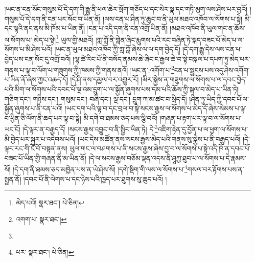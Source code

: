།ཡང་ན་ངན་སོང་གསུམ་པོ་དེ་དག་གི་རྒྱུ་ནི་ཕལ་ཆེར་སྲོག་གཅོད་པ་དང་སེར་སྣ་དང་གཏི་མུག་ལས་ཤེས་པར་བྱའོ། །གསུམ་པོ་དེ་དག་ནི་ངན་པར་སོང་བ་ཡིན་ནོ། །ལས་ངན་པ་ཤིན་ཏུ་ཆུང་བ་ནི་ཡུལ་མཐའ་འཁོབ་ལ་སོགས་པ་སྟེ། མི་དང་ལྷའི་ནང་ནས་མི་ཁོམ་པ་ཡིན་ནོ། །ངན་པ་འདི་དག་ནི་ངན་འགྲོ་ཡིན་ནོ། །མཐའ་འཁོབ་ནི་ཡུལ་གང་ན་ཆོས་ལ་སོགས་པ་:མེད་པ་སྟེ།\footnote{མེད་པའོ།  སྣར་ཐང་།  པེ་ཅིན། } ཡུལ་གྱི་མཐའོ། །ཀླ་ཀློ་ནི་གླེན་ཞིང་རྨུགས་པའི་རང་བཞིན་ཏེ་སྐད་བཟང་པོ་མེད་པ་ལ་སོགས་པ་མི་ཤེས་པའོ། །ཡང་ན་ཡུལ་མཐའ་འཁོབ་ཀྱི་ཀླ་ཀློ་ཞེས་ལ་ལ་དག་བྱེད་དོ། །དེ་དག་རྒྱུ་དེས་ལས་ངན་པ་བྱེད་པས་ངན་སོང་དུ་འགྲོ་བའོ། །ལྷ་ཚེ་རིང་པོ་ནི་བསོད་ནམས་ཆེ་ཞིང་ང་རྒྱལ་ཆེ་བ་སྟེ་བསྐལ་པ་དཔག་ཏུ་མེད་པར་གནས་པ་ལྟ་བ་ལོག་པ་གཟུགས་ཀྱི་ཁམས་ཀྱི་གནས་ནའོ། །ཡང་ན་:འགོག་པ་\footnote{འགག་པ་  སྣར་ཐང་། }ངན་པ་སྦྱངས་པས་འདུ་ཤེས་འགོག་པ་ཡིན་ནོ་ཞེས་ཀྱང་འཆད་དོ། །དེ་ཤི་ནས་དམྱལ་བར་འགྱུར་རོ། །མིར་སྐྱེས་ན་གཟུགས་ལ་སོགས་པ་ལ་དབང་བྱེད་པའི་མིག་ལ་སོགས་པའི་དབང་པོ་ལྔ་འམ་དྲུག་པ་ལ་སྐྱོན་ཞུགས་པས་དམ་པའི་ཆོས་ཀྱི་སྐལ་བ་མེད་པ་ཡིན་ཏེ། གཅིག་དང་། གཉིས་དང་། གསུམ་དང་། བཞི་དང་། ལྔ་དང་། དྲུག་ཀ་མ་ཚང་བ་སྲིད་དོ། །ཤིན་ཏུ་ཡིད་ཀྱི་དབང་པོ་ལ་སྐྱོན་ཞུགས་པ་ནི་ངན་པའོ། །ཡང་དག་པའི་ལྟ་བ་དང་བྲལ་བ་སྟེ་སངས་རྒྱས་ལ་སོགས་པ་མེད་དོ་ཞེས་སེམས་པ་ལྟ་བ་ཕྱིན་ཅི་ལོག་ནི་ཆད་པར་ལྟ་བ་སྟེ། མི་དགེ་བ་ཐམས་ཅད་པས་ལྕི་བའོ། །གཞན་པ་རྟག་པར་ལྟ་བ་ལ་སོགས་པ་ཡང་ངོ། །དེ་ལྟར་ན་བརྒྱད་དོ། །སངས་རྒྱས་འབྱུང་བ་ནི་སྤྱིར་ཡིན་ཏེ། དེ་\footnote{}འཇིག་རྟེན་དུ་བྱོན་པ་ལ་ཕྱག་ལ་སོགས་པ་མི་བྱེད་པར་སྐུར་པ་འདེབས་པའོ། །ཡང་དེས་མཚོན་ནས་སངས་རྒྱས་མེད་པའི་གནས་སུ་སྐྱེས་པ་ནི་བརྒྱད་པའོ། །དེ་ལྟར་རང་གི་ངོ་བོ་བསྟན་ནས། ཡུལ་གང་ལ་བཤགས་པ་ནི་སངས་རྒྱས་ཞེས་བྱ་བ་ལ་སོགས་པ་སྟེ་འདི་ཁོ་ན་དབང་པོ་བཟང་པོ་ཡིན་གྱི་གཞན་ནི་མ་ཡིན་ནོ། །དེ་ལ་སངས་རྒྱས་བཅོམ་ལྡན་འདས་ནི་ཤཱཀྱ་ཐུབ་པ་ལ་སོགས་པ་དེ་རྣམས་སོ། །དེ་དག་ནི་ཐམས་ཅད་མཁྱེན་པས་ན་ཡེ་ཤེས་སོ། །དགེ་སྡིག་གི་ལས་ལ་སོགས་པ་\footnote{པར་  སྣར་ཐང་།  པེ་ཅིན། }གསལ་བར་རྟོགས་པས་ན་སྤྱན་ནོ། །དབང་པོ་ནི་ལེགས་པ་དང་ཉེས་པའི་ཁྱད་པར་ཐུགས་སུ་ཆུད་པའོ། །
